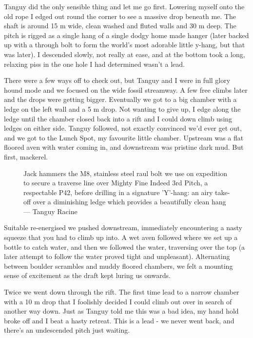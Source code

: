 Tanguy did the only sensible thing and let me go first. Lowering myself onto the old rope I edged out round the corner to see a massive drop beneath me. The shaft is around 15 m wide, clean washed and fluted walls and 30 m deep. The pitch is rigged as a single hang of a single dodgy home made hanger (later backed up with a through bolt to form the world’s most adorable little y-hang, but that was later). I descended slowly, not really at ease, and at the bottom took a long, relaxing piss in the one hole I had determined wasn’t a lead.
 
There were a few ways off to check out, but Tanguy and I were in full glory hound mode and we focused on the wide fossil streamway. A few free climbs later and the drops were getting bigger. Eventually we got to a big chamber with a ledge on the left wall and a 5 m drop. Not wanting to give up, I edge along the ledge until the chamber closed back into a rift and I could down climb using ledges on either side. Tanguy followed, not exactly convinced we’d ever get out, and we got to the Lunch Spot, my favourite little chamber. Upstream was a flat floored aven with water coming in, and downstream was pristine dark mud. But first, mackerel.
 
 
 \begin{figure}[t!]
\checkoddpage \ifoddpage \forcerectofloat \else \forceversofloat \fi
\centering
{}
\caption{Jack hammers the M8, stainless steel raul bolt we use on expedition to secure a traverse line over Mighty Fine Indeed 3rd Pitch, a respectable P42, before drilling in a signature 'Y'-hang: an airy take-off over a diminishing ledge which provides a beautifully clean hang --- Tanguy Racine  }
\label{the creature}
\end{figure}

Suitable re-energised we pushed downstream, immediately encountering a nasty squeeze that you had to climb up into. A wet aven followed where we set up a bottle to catch water, and then we followed the water, traversing over the top (a later attempt to follow the water proved tight and unpleasant). Alternating between boulder scrambles and muddy floored chambers, we felt a mounting sense of excitement as the draft kept luring us onwards.
 
Twice we went down through the rift. The first time lead to a narrow chamber with a 10 m drop that I foolishly decided I could climb out over in search of another way down. Just as Tanguy told me this was a bad idea, my hand hold broke off and I beat a hasty retreat. This is a lead - we never went back, and there’s an undescended pitch just waiting.
 
